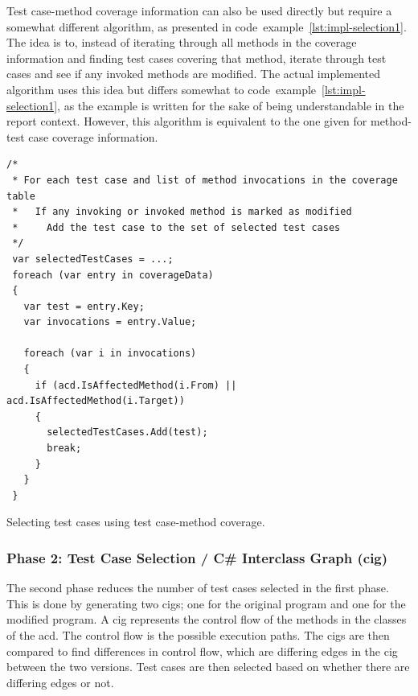 \documentclass[a4paper,english,12pt]{report}
\begin{document}
Test case-method coverage information can also be used directly but require a somewhat different algorithm, as presented in code~example~\vref{lst:impl-selection1}. The idea is to, instead of iterating through all methods in the coverage information and finding test cases covering that method, iterate through test cases and see if any invoked methods are modified. The actual implemented algorithm uses this idea but differs somewhat to code~example~\vref{lst:impl-selection1}, as the example is written for the sake of being understandable in the report context. However, this algorithm is equivalent to the one given for method-test case coverage information.

\begin{listing}[htbp]
{\footnotesize
\begin{verbatim}
/*
 * For each test case and list of method invocations in the coverage table
 *   If any invoking or invoked method is marked as modified
 *     Add the test case to the set of selected test cases
 */
 var selectedTestCases = ...;
 foreach (var entry in coverageData)
 {
   var test = entry.Key;
   var invocations = entry.Value; 
 
   foreach (var i in invocations)
   {
     if (acd.IsAffectedMethod(i.From) || acd.IsAffectedMethod(i.Target))
     {
       selectedTestCases.Add(test);
       break;
     }
   }
 }
\end{verbatim}
}
\caption{Selecting test cases using test case-method coverage.}
\label{lst:impl-selection1}
\end{listing}

\subsubsection{Phase 2: Test Case Selection / C\# Interclass Graph (\gls{cig})}
The second phase reduces the number of test cases selected in the first phase. This is done by generating two \gls{cig}s; one for the original program and one for the modified program. A \gls{cig} represents the control flow of the methods in the classes of the \gls{acd}. The control flow is the possible execution paths. The \gls{cig}s are then compared to find differences in control flow, which are differing edges in the \gls{cig} between the two versions. Test cases are then selected based on whether there are differing edges or not.
\end{document}
